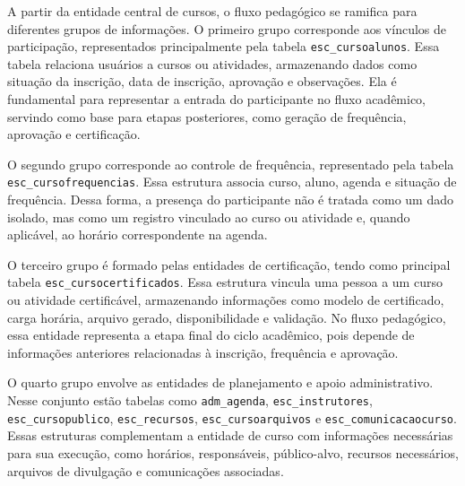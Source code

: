 A partir da entidade central de cursos, o fluxo pedagógico se ramifica
para diferentes grupos de informações. O primeiro grupo corresponde aos
vínculos de participação, representados principalmente pela tabela
\texttt{esc\_cursoalunos}. Essa tabela relaciona usuários a cursos ou
atividades, armazenando dados como situação da inscrição, data de
inscrição, aprovação e observações. Ela é fundamental para representar
a entrada do participante no fluxo acadêmico, servindo como base para
etapas posteriores, como geração de frequência, aprovação e
certificação.

O segundo grupo corresponde ao controle de frequência, representado pela
tabela \texttt{esc\_cursofrequencias}. Essa estrutura associa curso,
aluno, agenda e situação de frequência. Dessa forma, a presença do
participante não é tratada como um dado isolado, mas como um registro
vinculado ao curso ou atividade e, quando aplicável, ao horário
correspondente na agenda.

O terceiro grupo é formado pelas entidades de certificação, tendo como
principal tabela \texttt{esc\_cursocertificados}. Essa estrutura vincula
uma pessoa a um curso ou atividade certificável, armazenando
informações como modelo de certificado, carga horária, arquivo gerado,
disponibilidade e validação. No fluxo pedagógico, essa entidade
representa a etapa final do ciclo acadêmico, pois depende de
informações anteriores relacionadas à inscrição, frequência e
aprovação.

O quarto grupo envolve as entidades de planejamento e apoio
administrativo. Nesse conjunto estão tabelas como \texttt{adm\_agenda},
\texttt{esc\_instrutores}, \texttt{esc\_cursopublico},
\texttt{esc\_recursos}, \texttt{esc\_cursoarquivos} e
\texttt{esc\_comunicacaocurso}. Essas estruturas complementam a entidade
de curso com informações necessárias para sua execução, como horários,
responsáveis, público-alvo, recursos necessários, arquivos de
divulgação e comunicações associadas.

